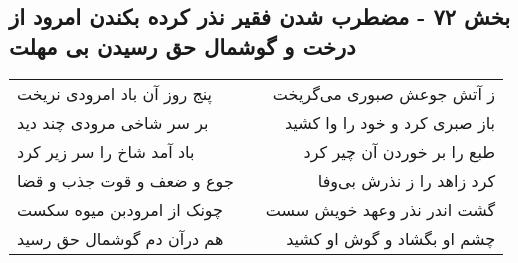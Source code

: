 \begin{center}
\section*{بخش ۷۲ - مضطرب شدن فقیر نذر کرده بکندن امرود از درخت و گوشمال حق رسیدن بی مهلت}
\label{sec:sh072}
\begin{longtable}{l p{0.5cm} r}
پنج روز آن باد امرودی نریخت
&&
ز آتش جوعش صبوری می‌گریخت
\\
بر سر شاخی مرودی چند دید
&&
باز صبری کرد و خود را وا کشید
\\
باد آمد شاخ را سر زیر کرد
&&
طبع را بر خوردن آن چیر کرد
\\
جوع و ضعف و قوت جذب و قضا
&&
کرد زاهد را ز نذرش بی‌وفا
\\
چونک از امرودبن میوه سکست
&&
گشت اندر نذر وعهد خویش سست
\\
هم درآن دم گوشمال حق رسید
&&
چشم او بگشاد و گوش او کشید
\\
\end{longtable}
\end{center}

